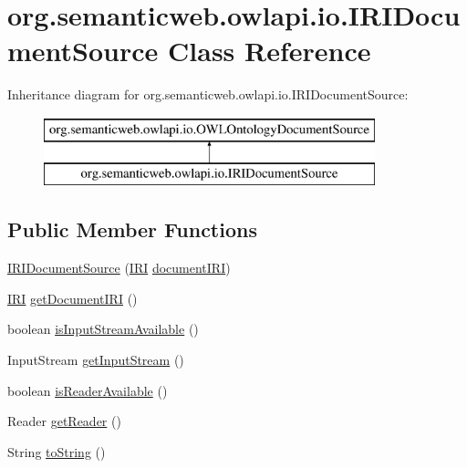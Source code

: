 \hypertarget{classorg_1_1semanticweb_1_1owlapi_1_1io_1_1_i_r_i_document_source}{\section{org.\-semanticweb.\-owlapi.\-io.\-I\-R\-I\-Document\-Source Class Reference}
\label{classorg_1_1semanticweb_1_1owlapi_1_1io_1_1_i_r_i_document_source}
}
Inheritance diagram for org.\-semanticweb.\-owlapi.\-io.\-I\-R\-I\-Document\-Source\-:\begin{figure}[H]
\begin{center}
\leavevmode
\includegraphics[height=2.000000cm]{classorg_1_1semanticweb_1_1owlapi_1_1io_1_1_i_r_i_document_source}
\end{center}
\end{figure}
\subsection*{Public Member Functions}
\begin{DoxyCompactItemize}
\item 
\hyperlink{classorg_1_1semanticweb_1_1owlapi_1_1io_1_1_i_r_i_document_source_a6f80a8d92a4f4041345c772544c47347}{I\-R\-I\-Document\-Source} (\hyperlink{classorg_1_1semanticweb_1_1owlapi_1_1model_1_1_i_r_i}{I\-R\-I} \hyperlink{classorg_1_1semanticweb_1_1owlapi_1_1io_1_1_i_r_i_document_source_a5b8e6720bd6143601f14ae473dd1bd01}{document\-I\-R\-I})
\item 
\hyperlink{classorg_1_1semanticweb_1_1owlapi_1_1model_1_1_i_r_i}{I\-R\-I} \hyperlink{classorg_1_1semanticweb_1_1owlapi_1_1io_1_1_i_r_i_document_source_a4813dbfb2d5038475eb5c165a02ace1e}{get\-Document\-I\-R\-I} ()
\item 
boolean \hyperlink{classorg_1_1semanticweb_1_1owlapi_1_1io_1_1_i_r_i_document_source_af6bb70aa808a7fec7187cd8bdcd57302}{is\-Input\-Stream\-Available} ()
\item 
Input\-Stream \hyperlink{classorg_1_1semanticweb_1_1owlapi_1_1io_1_1_i_r_i_document_source_a1ffc6e478c0fa8a28804ff74b01cd235}{get\-Input\-Stream} ()
\item 
boolean \hyperlink{classorg_1_1semanticweb_1_1owlapi_1_1io_1_1_i_r_i_document_source_abf31b14fd21994edf018099ee971575e}{is\-Reader\-Available} ()
\item 
Reader \hyperlink{classorg_1_1semanticweb_1_1owlapi_1_1io_1_1_i_r_i_document_source_ad0d8c9384f6432424597659f279e0214}{get\-Reader} ()
\item 
String \hyperlink{classorg_1_1semanticweb_1_1owlapi_1_1io_1_1_i_r_i_document_source_ad9a4dcfe589580f1796af48b93cb0048}{to\-String} ()
\end{DoxyCompactItemize}
